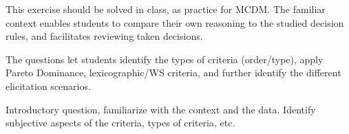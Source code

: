 \documentclass[answers, 10pt, UKenglish]{exam}
\begin{document}
\begin{questions}
\begin{solutionorbox}
	{
		\color{red}
		This exercise should be solved in class, as practice for MCDM.
		The familiar
		context enables students to compare their own reasoning to the
		studied decision rules, and facilitates reviewing taken
		decisions. 

		The questions let students identify the types of criteria
		(order/type),
		apply Pareto Dominance, lexicographic/WS criteria, and further
		identify the different elicitation scenarios. 
	}
\end{solutionorbox}

	\question
	
	
	\begin{solutionorbox}
	{ 
		\color{red} Introductory question, familiarize with the context
		and the data. Identify subjective aspects of the criteria, types 
		of criteria, etc.

}
\end{solutionorbox}
\end{questions}
\end{document}
